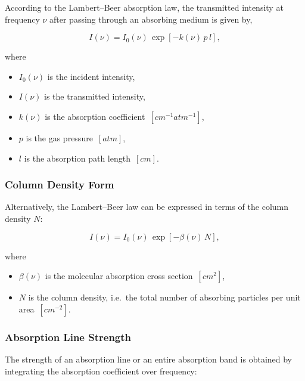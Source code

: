 According to the Lambert--Beer absorption law, the transmitted intensity
at frequency $\nu$ after passing through an absorbing medium is given by,

\begin{equation}
I(\nu) = I_0(\nu)\,
\exp\left[-k(\nu)\, p \, l \right],
\end{equation}

where

\begin{itemize}
    \item $I_0(\nu)$ is the incident intensity,
    \item $I(\nu)$ is the transmitted intensity,
    \item $k(\nu)$ is the absorption coefficient 
    \,$[\si{cm^{-1} atm^{-1}}]$,
    \item $p$ is the gas pressure \,$[\si{atm}]$,
    \item $l$ is the absorption path length \,$[\si{cm}]$.
\end{itemize}


\subsubsection*{Column Density Form}

Alternatively, the Lambert--Beer law can be expressed in terms of the
column density $N$:

\begin{equation}
I(\nu) = I_0(\nu)\,
\exp\left[-\beta(\nu)\, N \right],
\label{Equation: Lambert-Beer Law - coloumn form}
\end{equation}

where

\begin{itemize}
    \item $\beta(\nu)$ is the molecular absorption cross section 
    \,$[\si{cm^{2}}]$,
    \item $N$ is the column density, i.e.\ the total number of absorbing
    particles per unit area \,$[\si{cm^{-2}}]$.
\end{itemize}


\subsubsection*{Absorption Line Strength}

The strength of an absorption line or an entire absorption band is
obtained by integrating the absorption coefficient over frequency:

